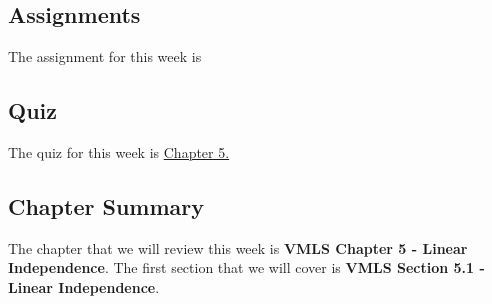 \subsection{Assignments}

The assignment for this week is   

\subsection{Quiz}

The quiz for this week is \href{https://applied.cs.colorado.edu/mod/quiz/view.php?id=50725}{Chapter 5.}  

\subsection{Chapter Summary}

The chapter that we will review this week is \textbf{VMLS Chapter 5 - Linear Independence}. The first section that we will cover is \textbf{VMLS Section 5.1 - Linear Independence}.

